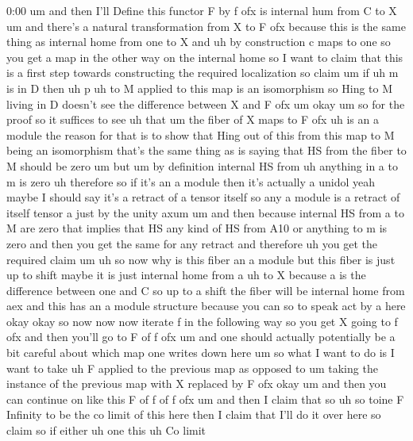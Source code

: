 \begin{unfinished}{0:00}
um  and  then  I'll  Define  this  functor  F
by  f  ofx  is  internal  hum  from  C  to
X  um  and  there's  a  natural
transformation  from  X  to  F  ofx  because
this  is  the  same  thing  as  internal  home
from  one  to
X  and  uh  by  construction  c  maps  to  one
so  you  get  a  map  in  the  other  way  on  the
internal
home
so  I  want  to  claim  that  this  is  a  first
step  towards  constructing  the  required
localization  so  claim
um
if  uh  m  is  in  D  then
uh  p  uh  to
M  applied  to  this  map  is  an
isomorphism
so  Hing  to  M  living  in  D  doesn't  see  the
difference  between  X  and  F  ofx
um  okay
um  so  for  the
proof  so  it  suffices  to  see
uh  that  um  the
fiber  of  X  maps  to  F
ofx  uh  is  an  a
module  the  reason  for  that  is  to  show
that  Hing  out  of  this  from  this  map  to  M
being  an  isomorphism  that's  the  same
thing  as  is  saying  that  HS  from  the
fiber  to  M  should  be
zero
um  but  um  by  definition  internal  HS  from
uh  anything  in  a  to  m  is
zero  uh  therefore  so  if  it's  an  a  module
then  it's  actually  a  unidol  yeah  maybe  I
should  say  it's  a  retract  of  a  tensor
itself  so  any  a  module  is  a  retract  of
itself  tensor  a  just  by  the  unity  axum
um  and  then  because  internal  HS  from  a
to  M  are  zero  that  implies  that  HS  any
kind  of  HS  from  A10  or  anything  to  m  is
zero  and  then  you  get  the  same  for  any
retract  and
therefore  uh  you  get  the  required
claim
um  uh  so  now  why  is  this  fiber  an  a
module  but  this  fiber  is  just  up  to
shift  maybe  it  is  just  internal  home
from  a  uh
to  X  because  a  is  the  difference  between
one  and  C  so  up  to  a  shift  the  fiber
will  be  internal  home  from  aex  and  this
has  an  a  module  structure  because  you
can  so  to  speak  act  by  a
here
okay
okay  so  now  now  now  iterate  f
in  the  following  way  so  you  get  X  going
to  f
ofx  and  then  you'll  go  to  F  of  f
ofx  um  and  one  should  actually
potentially  be  a  bit  careful  about  which
map  one  writes  down
here  um  so  what  I  want  to  do  is  I  want
to  take  uh  F  applied  to  the  previous
map  as  opposed  to  um
taking  the  instance  of  the  previous  map
with  X  replaced  by  F
ofx
okay  um  and  then  you  can  continue  on
like  this  F  of  f  of  f
ofx  um  and  then  I  claim  that
so  uh  so  toine  F
Infinity  to  be  the  co  limit  of  this
here  then  I  claim  that  I'll  do  it  over
here  so
claim  so  if
either  uh  one  this  uh  Co  limit

\end{unfinished}
